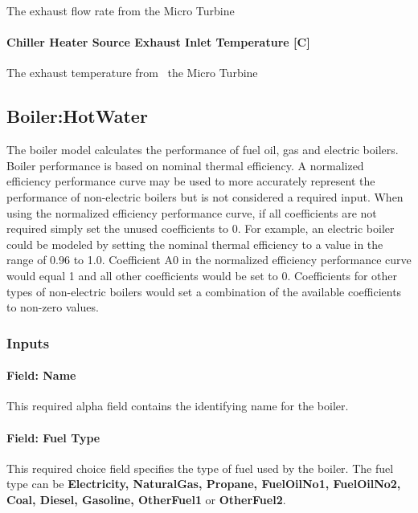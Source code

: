 The exhaust flow rate from the Micro Turbine

\paragraph{Chiller Heater Source Exhaust Inlet Temperature {[}C{]}}\label{chiller-heater-source-exhaust-inlet-temperature-c}

The exhaust temperature from~ the Micro Turbine

\subsection{Boiler:HotWater}\label{boilerhotwater}

The boiler model calculates the performance of fuel oil, gas and electric boilers. Boiler performance is based on nominal thermal efficiency. A normalized efficiency performance curve may be used to more accurately represent the performance of non-electric boilers but is not considered a required input. When using the normalized efficiency performance curve, if all coefficients are not required simply set the unused coefficients to 0. For example, an electric boiler could be modeled by setting the nominal thermal efficiency to a value in the range of 0.96 to 1.0. Coefficient A0 in the normalized efficiency performance curve would equal 1 and all other coefficients would be set to 0. Coefficients for other types of non-electric boilers would set a combination of the available coefficients to non-zero values.

\subsubsection{Inputs}\label{inputs-10-013}

\paragraph{Field: Name}\label{field-name-9-012}

This required alpha field contains the identifying name for the boiler.

\paragraph{Field: Fuel Type}\label{field-fuel-type-3-000}

This required choice field specifies the type of fuel used by the boiler. The fuel type can be \textbf{Electricity, NaturalGas, Propane, FuelOilNo1, FuelOilNo2, Coal, Diesel, Gasoline, OtherFuel1} or \textbf{OtherFuel2}.

